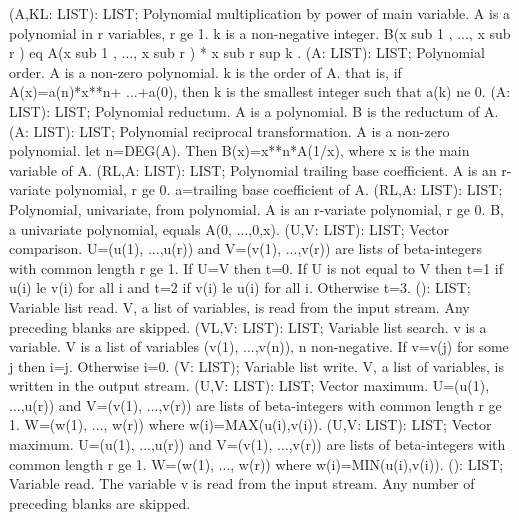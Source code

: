  (A,KL: LIST): LIST; \eproc
\bcom Polynomial multiplication by power of main variable. A is a
polynomial in r variables, r ge 1.  k is a non-negative integer.
B(x sub 1 , ..., x sub r ) eq A(x sub 1 , ..., x sub r ) *
x sub r sup k . \ecom 
{} (A: LIST): LIST; \eproc
\bcom Polynomial order. A is a non-zero polynomial. k is the order of A.
that is, if A(x)=a(n)*x**n+ ...+a(0), then k is the smallest
integer such that a(k) ne 0. \ecom 
{} (A: LIST): LIST; \eproc
\bcom Polynomial reductum. A is a polynomial. B is the reductum of A. \ecom 
{} (A: LIST): LIST; \eproc
\bcom Polynomial reciprocal transformation. A is a non-zero polynomial.
let n=DEG(A).  Then B(x)=x**n*A(1/x), where x is the main
variable of A. \ecom 
{} (RL,A: LIST): LIST; \eproc
\bcom Polynomial trailing base coefficient. A is an r-variate polynomial,
r ge 0. a=trailing base coefficient of A. \ecom 
{} (RL,A: LIST): LIST; \eproc
\bcom Polynomial, univariate, from polynomial. A is an r-variate
polynomial, r ge 0. B, a univariate polynomial, equals A(0, ...,0,x). \ecom 
{} (U,V: LIST): LIST; \eproc
\bcom Vector comparison. U=(u(1), ...,u(r)) and V=(v(1), ...,v(r))
are lists of beta-integers with common length r ge 1.  If U=V
then t=0.  If U is not equal to V then t=1 if u(i) le v(i) for
all i and t=2 if v(i) le u(i) for all i. Otherwise t=3. \ecom 
{} (): LIST; \eproc
\bcom Variable list read. V, a list of variables, is read from the input
stream. Any preceding blanks are skipped. \ecom 
{} (VL,V: LIST): LIST; \eproc
\bcom Variable list search. v is a variable. V is a list of variables
(v(1), ...,v(n)), n non-negative.  If v=v(j) for some j then
i=j. Otherwise i=0. \ecom 
{} (V: LIST); \eproc
\bcom Variable list write. V, a list of variables, is written in the
output stream. \ecom 
{} (U,V: LIST): LIST; \eproc
\bcom Vector maximum. U=(u(1), ...,u(r)) and V=(v(1), ...,v(r)) are
lists of beta-integers with common length r ge 1.  W=(w(1), ...,
w(r)) where w(i)=MAX(u(i),v(i)). \ecom 
{} (U,V: LIST): LIST; \eproc
\bcom Vector maximum. U=(u(1), ...,u(r)) and V=(v(1), ...,v(r)) are
lists of beta-integers with common length r ge 1.  W=(w(1), ...,
w(r)) where w(i)=MIN(u(i),v(i)). \ecom 
{} (): LIST; \eproc
\bcom Variable read. The variable v is read from the input stream. Any
number of preceding blanks are skipped. \ecom 
